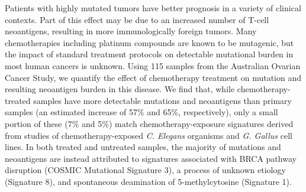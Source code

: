 Patients with highly mutated tumors have better prognosis in a variety of clinical contexts. Part of this effect may be due to an increased number of T-cell neoantigens, resulting in more immunologically foreign tumors. Many chemotherapies including platinum compounds are known to be mutagenic, but the impact of standard treatment protocols on detectable mutational burden in most human cancers is unknown. Using 115 samples from the Australian Ovarian Cancer Study, we quantify the effect of chemotherapy treatment on mutation and resulting neoantigen burden in this disease. We find that, while chemotherapy-treated samples have more detectable mutations and neoantigens than primary samples (an estimated increase of 57\% and 65\%, respectively), only a small portion of these (7\% and 5\%) match chemotherapy-exposure signatures derived from studies of chemotherapy-exposed \textit{C. Elegans} organisms and \textit{G. Gallus} cell lines. In both treated and untreated samples, the majority of mutations and neoantigens are instead attributed to signatures associated with BRCA pathway disruption (COSMIC Mutational Signature 3), a process of unknown etiology (Signature 8), and spontaneous deamination of 5-methylcytosine (Signature 1).





